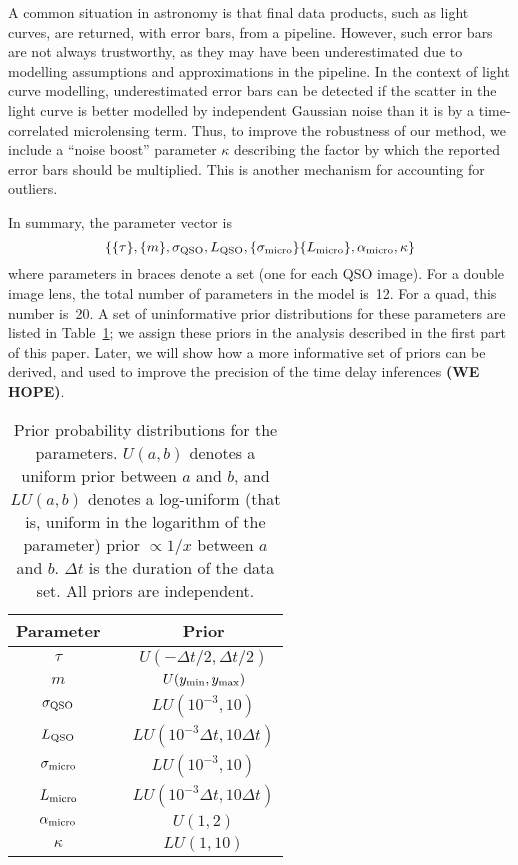 \documentclass[useAMS,usenatbib, a4paper]{mn2e} \usepackage{natbib}
\begin{document}
A common situation in astronomy is that final data products, such as light
curves, are returned, with error bars, from a pipeline. However, such error
bars are not always trustworthy, as they may have been underestimated due to
modelling assumptions and approximations in the pipeline. In the context of
light curve modelling, underestimated error bars can be detected if the
scatter in the light curve is better modelled by independent Gaussian noise
than it is by a time-correlated microlensing term. Thus, to improve the
robustness of our method, we include a ``noise boost'' parameter $\kappa$
describing the factor by which the reported error bars should be multiplied.
This is another mechanism for accounting for outliers.

In summary, the parameter vector is
\begin{equation}
\left\{ \{\tau\}, \{m\}, \sigma_{\rm QSO}, L_{\rm QSO}, \{\sigma_{\rm micro}\}
\{L_{\rm micro}\}, \alpha_{\rm micro}, \kappa \right\}
\end{equation}
where parameters in braces denote a set (one for each QSO image).  For a
double image lens, the total number of parameters in the model is~12. For a
quad, this number is~20. A set of uninformative prior
distributions for these parameters are listed in Table~\ref{priors}; we assign
these priors in the analysis described in the first part of this paper. Later,
we will show how a more informative set of priors can be derived, and used to
improve the precision of the time delay inferences {\bf (WE HOPE)}.

\begin{table}
\begin{center}
\begin{tabular}{ccc}
Parameter & \vline & Prior \\
\hline
$\tau$ & \vline & $U(-\Delta t/2, \Delta t/2)$ \\ 
$m$ & \vline & $U(y_{\rm min}, y_{\rm max})$ \\
$\sigma_{\rm QSO}$ & \vline & $LU(10^{-3}, 10)$ \\
$L_{\rm QSO}$ & \vline & $LU(10^{-3}\Delta t, 10\Delta t)$ \\
$\sigma_{\rm micro}$ & \vline & $LU(10^{-3}, 10)$ \\
$L_{\rm micro}$ & \vline & $LU(10^{-3}\Delta t, 10\Delta t)$ \\
$\alpha_{\rm micro}$ & \vline & $U(1, 2)$ \\
$\kappa$ & \vline & $LU(1, 10)$
\end{tabular}
\end{center}
\caption{Prior probability distributions for the parameters. $U(a, b)$ denotes
a uniform prior between $a$ and $b$, and $LU(a, b)$ denotes a log-uniform
(that is, uniform in the logarithm of the parameter) prior $\propto 1/x$
between $a$ and $b$. $\Delta t$ is the duration of the data set. All priors
are independent.\label{priors}}
\end{table}
\end{document}

